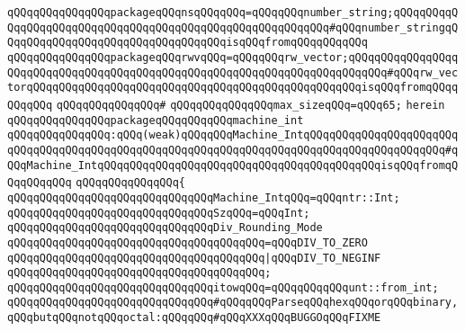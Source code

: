 \verb|qQQqqQQqqQQqqQQqpackageqQQqnsqQQqqQQq=qQQqqQQqnumber_string;qQQqqQQqqQQqqQQqqQQqqQQqqQQqqQQqqQQqqQQqqQQqqQQqqQQqqQQqqQQq#qQQqnumber_stringqQQqqQQqqQQqqQQqqQQqqQQqqQQqqQQqqQQqisqQQqfromqQQqqQQqqQQq|\newline
\verb|qQQqqQQqqQQqqQQqpackageqQQqrwvqQQq=qQQqqQQqrw_vector;qQQqqQQqqQQqqQQqqQQqqQQqqQQqqQQqqQQqqQQqqQQqqQQqqQQqqQQqqQQqqQQqqQQqqQQqqQQq#qQQqrw_vectorqQQqqQQqqQQqqQQqqQQqqQQqqQQqqQQqqQQqqQQqqQQqqQQqqQQqisqQQqfromqQQqqQQqqQQq|\newline
\verb|qQQqqQQqqQQqqQQq#|\newline
\verb|qQQqqQQqqQQqqQQqmax_sizeqQQq=qQQq65;|\newline
\verb|herein|\newline
\newline
\verb|qQQqqQQqqQQqqQQqpackageqQQqqQQqqQQqmachine_int|\newline
\verb|qQQqqQQqqQQqqQQq:qQQq(weak)qQQqqQQqMachine_IntqQQqqQQqqQQqqQQqqQQqqQQqqQQqqQQqqQQqqQQqqQQqqQQqqQQqqQQqqQQqqQQqqQQqqQQqqQQqqQQqqQQqqQQqqQQq#qQQqMachine_IntqQQqqQQqqQQqqQQqqQQqqQQqqQQqqQQqqQQqqQQqqQQqisqQQqfromqQQqqQQqqQQq|\newline
\verb|qQQqqQQqqQQqqQQq{|\newline
\verb|qQQqqQQqqQQqqQQqqQQqqQQqqQQqqQQqMachine_IntqQQq=qQQqntr::Int;|\newline
\verb|qQQqqQQqqQQqqQQqqQQqqQQqqQQqqQQqSzqQQq=qQQqInt;|\newline
\newline
\verb|qQQqqQQqqQQqqQQqqQQqqQQqqQQqqQQqDiv_Rounding_Mode|\newline
\verb|qQQqqQQqqQQqqQQqqQQqqQQqqQQqqQQqqQQqqQQq=qQQqDIV_TO_ZERO|\newline
\verb|qQQqqQQqqQQqqQQqqQQqqQQqqQQqqQQqqQQqqQQq|\verb#|qQQqDIV_TO_NEGINF#\newline
\verb|qQQqqQQqqQQqqQQqqQQqqQQqqQQqqQQqqQQqqQQq;|\newline
\newline
\verb|qQQqqQQqqQQqqQQqqQQqqQQqqQQqqQQqitowqQQq=qQQqqQQqqQQqunt::from_int;|\newline
\newline
\verb|qQQqqQQqqQQqqQQqqQQqqQQqqQQqqQQq#qQQqqQQqParseqQQqhexqQQqorqQQqbinary,qQQqbutqQQqnotqQQqoctal:qQQqqQQq#qQQqXXXqQQqBUGGOqQQqFIXME|\newline
